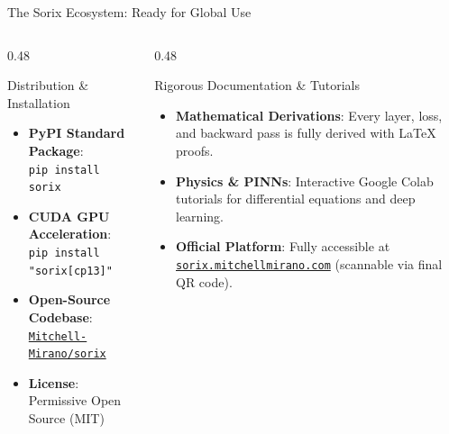 \documentclass[11pt,aspectratio=169]{beamer}
\begin{document}
\begin{frame}{The Sorix Ecosystem: Ready for Global Use}
  \begin{columns}[T,onlytextwidth]
    \begin{column}{0.48\textwidth}
      \begin{block}{Distribution \& Installation}
        \begin{itemize}
          \setlength{\itemsep}{0.32em}
          \item \textbf{PyPI Standard Package}:\\
            \texttt{pip install sorix}
          \item \textbf{CUDA GPU Acceleration}:\\
            \texttt{pip install "sorix[cp13]"}
          \item \textbf{Open-Source Codebase}:\\
            \href{https://github.com/Mitchell-Mirano/sorix}{\texttt{Mitchell-Mirano/sorix}}
          \item \textbf{License}: Permissive Open Source (MIT)
        \end{itemize}
      \end{block}
    \end{column}

    \begin{column}{0.48\textwidth}
      \begin{exampleblock}{Rigorous Documentation \& Tutorials}
        \begin{itemize}
          \setlength{\itemsep}{0.32em}
          \item \textbf{Mathematical Derivations}: Every layer, loss, and backward pass is fully derived with LaTeX proofs.
          \item \textbf{Physics \& PINNs}: Interactive Google Colab tutorials for differential equations and deep learning.
          \item \textbf{Official Platform}: Fully accessible at \href{https://sorix.mitchellmirano.com}{\texttt{sorix.mitchellmirano.com}} (scannable via final QR code).
        \end{itemize}
      \end{exampleblock}
    \end{column}
  \end{columns}
\end{frame}
\end{document}
